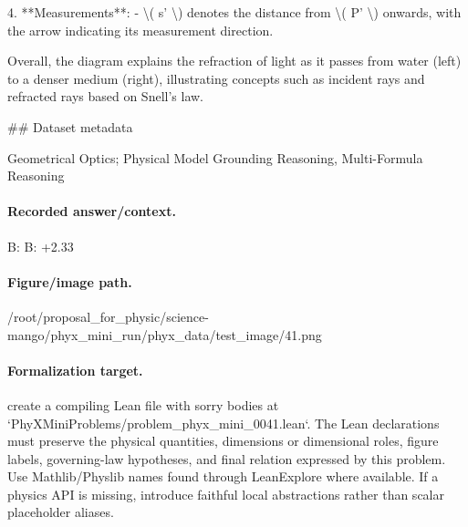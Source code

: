 4. **Measurements**:
   - \textbackslash{}( s' \textbackslash{}) denotes the distance from \textbackslash{}( P' \textbackslash{}) onwards, with the arrow indicating its measurement direction.

Overall, the diagram explains the refraction of light as it passes from water (left) to a denser medium (right), illustrating concepts such as incident rays and refracted rays based on Snell's law.

\#\# Dataset metadata

Geometrical Optics; Physical Model Grounding Reasoning, Multi-Formula Reasoning

\paragraph{Recorded answer/context.}
B: B: +2.33

\paragraph{Figure/image path.}
/root/proposal\_for\_physic/science-mango/phyx\_mini\_run/phyx\_data/test\_image/41.png

\paragraph{Formalization target.}
create a compiling Lean file with sorry bodies at `PhyXMiniProblems/problem\_phyx\_mini\_0041.lean`. The Lean declarations must preserve the physical quantities, dimensions or dimensional roles, figure labels, governing-law hypotheses, and final relation expressed by this problem.
Use Mathlib/Physlib names found through LeanExplore where available. If a physics API is missing, introduce faithful local abstractions rather than scalar placeholder aliases.

